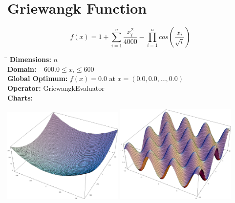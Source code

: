 \documentclass[12pt, a4paper]{article}
\begin{document}
	\newpage

	\section*{Griewangk Function}
		\begin{equation*}
			f(x) = 1 + \sum_{i=1}^n \frac{x_i^2}{4000} - \prod_{i=1}^n cos(\frac{x_i}{\sqrt i})
		\end{equation*}

		\begin{tabbing}
			\hspace{5cm}\=\kill
			\textbf{Dimensions:}     \> $n$ \\
			\textbf{Domain:}         \> $-600.0 \leq x_i \leq 600$ \\
			\textbf{Global Optimum:} \> $f(x) = 0.0$ at $x = (0.0, 0.0, \dots, 0.0)$ \\
			\textbf{Operator:}       \> GriewangkEvaluator \\
			\textbf{Charts:}         \> \\
		\end{tabbing}

		\begin{center}
			\includegraphics[width=0.45\textwidth]{Images/Griewangk_large}
			\hfill
			\includegraphics[width=0.45\textwidth]{Images/Griewangk_small}
		\end{center}
\end{document}
